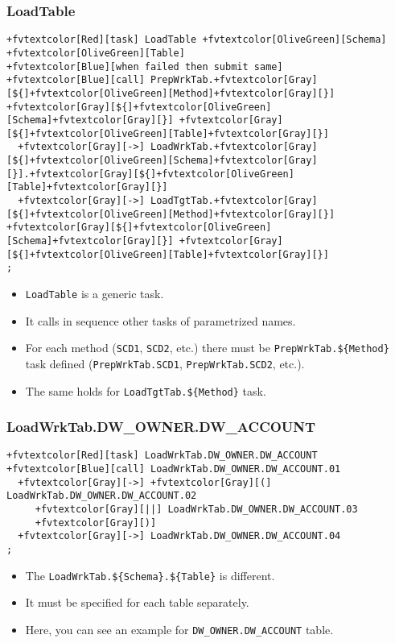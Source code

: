 \documentclass[english,xcolor={dvipsnames}]{beamer}
\begin{document}
\begin{frame}[fragile]
\frametitle{LoadTable}
\begin{Verbatim}[commandchars=+\[\]]
+fvtextcolor[Red][task] LoadTable +fvtextcolor[OliveGreen][Schema] +fvtextcolor[OliveGreen][Table]
+fvtextcolor[Blue][when failed then submit same]
+fvtextcolor[Blue][call] PrepWrkTab.+fvtextcolor[Gray][${]+fvtextcolor[OliveGreen][Method]+fvtextcolor[Gray][}] +fvtextcolor[Gray][${]+fvtextcolor[OliveGreen][Schema]+fvtextcolor[Gray][}] +fvtextcolor[Gray][${]+fvtextcolor[OliveGreen][Table]+fvtextcolor[Gray][}]
  +fvtextcolor[Gray][->] LoadWrkTab.+fvtextcolor[Gray][${]+fvtextcolor[OliveGreen][Schema]+fvtextcolor[Gray][}].+fvtextcolor[Gray][${]+fvtextcolor[OliveGreen][Table]+fvtextcolor[Gray][}]
  +fvtextcolor[Gray][->] LoadTgtTab.+fvtextcolor[Gray][${]+fvtextcolor[OliveGreen][Method]+fvtextcolor[Gray][}] +fvtextcolor[Gray][${]+fvtextcolor[OliveGreen][Schema]+fvtextcolor[Gray][}] +fvtextcolor[Gray][${]+fvtextcolor[OliveGreen][Table]+fvtextcolor[Gray][}]
;
\end{Verbatim}
\begin{itemize}
    \item \verb|LoadTable| is a generic task.
    \item It calls in sequence other tasks of parametrized names.
    \item For each method (\verb|SCD1|, \verb|SCD2|, etc.) there must be \verb|PrepWrkTab.${Method}| task defined (\verb|PrepWrkTab.SCD1|, \verb|PrepWrkTab.SCD2|, etc.).
    \item The same holds for \verb|LoadTgtTab.${Method}| task.
\end{itemize}
\end{frame}

\begin{frame}[fragile]
\frametitle{LoadWrkTab.DW\_OWNER.DW\_ACCOUNT}
\begin{Verbatim}[commandchars=+\[\]]
+fvtextcolor[Red][task] LoadWrkTab.DW_OWNER.DW_ACCOUNT
+fvtextcolor[Blue][call] LoadWrkTab.DW_OWNER.DW_ACCOUNT.01
  +fvtextcolor[Gray][->] +fvtextcolor[Gray][(]  LoadWrkTab.DW_OWNER.DW_ACCOUNT.02
     +fvtextcolor[Gray][||] LoadWrkTab.DW_OWNER.DW_ACCOUNT.03
     +fvtextcolor[Gray][)]
  +fvtextcolor[Gray][->] LoadWrkTab.DW_OWNER.DW_ACCOUNT.04
;
\end{Verbatim}
\begin{itemize}
    \item The \verb|LoadWrkTab.${Schema}.${Table}| is different.
    \item It must be specified for each table separately.
    \item Here, you can see an example for \verb|DW_OWNER.DW_ACCOUNT| table.
\end{itemize}
\end{frame}
\end{document}
